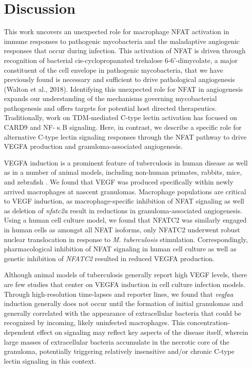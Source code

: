 \section{Discussion}

This work uncovers an unexpected role for macrophage NFAT activation in immune responses to pathogenic mycobacteria and the maladaptive angiogenic responses that occur during infection. This activation of NFAT is driven through recognition of bacterial cis\hyp{}cyclopropanated trehalose 6\hyp{}6'\hyp{}dimycolate, a major constituent of the cell envelope in pathogenic mycobacteria, that we have previously found is necessary and sufficient to drive pathological angiogenesis (Walton et al., 2018). Identifying this unexpected role for NFAT in angiogenesis expands our understanding of the mechanisms governing mycobacterial pathogenesis and offers targets for potential host directed therapeutics. Traditionally, work on TDM-mediated C-type lectin activation has focused on CARD9 and NF-$\upkappa$B signaling. Here, in contrast, we describe a specific role for alternative C-type lectin signaling responses through the NFAT pathway to drive VEGFA production and granuloma-associated angiogenesis. 

VEGFA induction is a prominent feature of tuberculosis in human disease as well as in a number of animal models, including non-human primates, rabbits, mice, and zebrafish \citep{Datta2015, Oehlers2015, Polena2016, Harding2019, Cronan2021, Gideon2022}. We found that VEGF was produced specifically within newly arrived macrophages at nascent granulomas. Macrophage populations are critical to VEGF induction, as macrophage-specific inhibition of NFAT signaling as well as deletion of \textit{nfatc2a} result in reductions in granuloma-associated angiogenesis. Using a human cell culture model, we found that NFATC2 was similarly engaged in human cells as amongst all NFAT isoforms, only NFATC2 underwent robust nuclear translocation in response to \textit{M. tuberculosis} stimulation. Correspondingly, pharmacological inhibition of NFAT signaling in human cell culture as well as genetic inhibition of \textit{NFATC2} resulted in reduced VEGFA production.

Although animal models of tuberculosis generally report high VEGF levels, there are few studies that center on VEGFA induction in cell culture infection models. Through high-resolution time-lapses and reporter lines, we found that \textit{vegfaa} induction generally does not occur until the formation of initial granulomas and generally correlated with the appearance of extracellular bacteria that could be recognized by incoming, likely uninfected macrophages. This concentration-dependent effect on signaling may reflect key aspects of the disease itself, wherein large masses of extracellular bacteria accumulate in the necrotic core of the granuloma, potentially triggering relatively insensitive and/or chronic C-type lectin signaling in this context.

